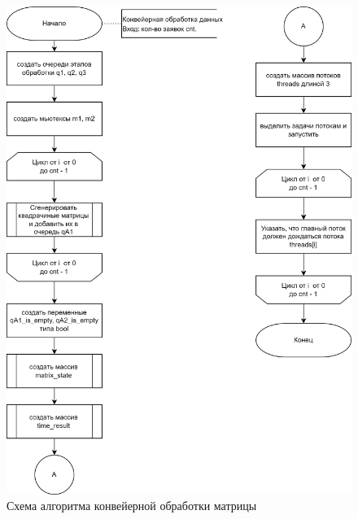 \clearpage

\begin{figure}[h]
	\centering
	\includegraphics[scale=0.2]{img/parallel_processing.png}
	\caption{Схема алгоритма конвейерной обработки матрицы}
	\label{fig:parallel_processing}
\end{figure}

\clearpage

